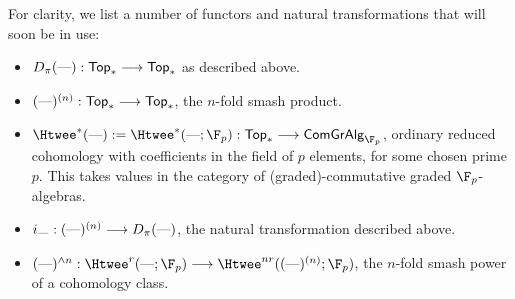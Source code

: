 For clarity, we list a number of functors and natural transformations that will soon be in use:
\begin{itemize}
\item $D_\pi(\DASH):\mathsf{Top}_*\to\mathsf{Top}_*$ as described above.
\item $(\textup{---})^{(n)}:\mathsf{Top}_*\to\mathsf{Top}_*$, the $n$-fold smash product.
\item $\Htwee^*(\DASH):=\Htwee^*(\textup{---};\F_p):\mathsf{Top}_*\to\mathsf{ComGrAlg}_{\F_p}$, ordinary reduced cohomology with coefficients in the field of $p$ elements, for some chosen prime $p$. This takes values in the category of (graded)-commutative graded $\F_p$-algebras.
\item $i_\DASH:(\DASH)^{(n)}\to D_\pi(\DASH)$, the natural transformation described above.
\item $(\DASH)^{\sprod n}:\Htwee^r(\textup{---};\F_p)\to\Htwee^{nr}((\DASH)^{(n)};\F_p)$, the $n$-fold smash power of a cohomology class.
\end{itemize}



